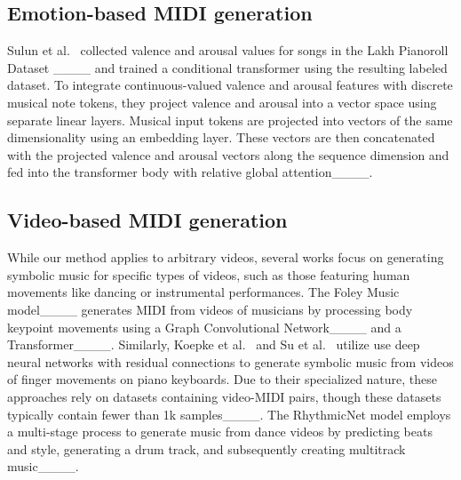 \subsection{Emotion-based MIDI generation}
\label{sec:emotion_based}

Sulun et al.~ collected valence and arousal values for songs in the Lakh Pianoroll Dataset ____ and trained a conditional transformer using the resulting labeled dataset. To integrate continuous-valued valence and arousal features with discrete musical note tokens, they project valence and arousal into a vector space using separate linear layers. 
Musical input tokens are projected into vectors of the same dimensionality using an embedding layer. These vectors are then concatenated with the projected valence and arousal vectors along the sequence dimension and fed into the transformer body with relative global attention____. 


\subsection{Video-based MIDI generation}

While our method applies to arbitrary videos, several works focus on generating symbolic music for specific types of videos, such as those featuring human movements like dancing or instrumental performances. The Foley Music model____ generates MIDI from videos of musicians by processing body keypoint movements using a Graph Convolutional Network____ and a Transformer____. Similarly, Koepke et al.~ and Su et al.~ utilize use deep neural networks with residual connections to generate symbolic music from videos of finger movements on piano keyboards. Due to their specialized nature, these approaches rely on datasets containing video-MIDI pairs, though these datasets typically contain fewer than 1k samples____. The RhythmicNet model employs a multi-stage process to generate music from dance videos by predicting beats and style, generating a drum track, and subsequently creating multitrack music____.

